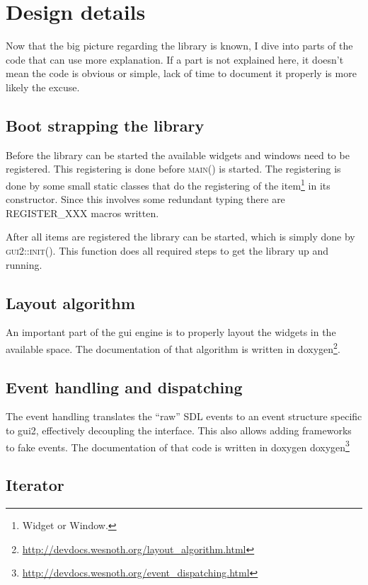 \chapter{Design details}

Now that the big picture regarding the library is known, I dive into parts of
the code that can use more explanation. If a part is not explained here, it doesn't mean
the code is obvious or simple, lack of time to document it properly is more
likely the excuse.

\section{Boot strapping the library}

Before the library can be started the available widgets and windows need to
be registered. This registering is done before \textsc{main()} is started.
The registering is done by some small static classes that do the registering
of the item\footnote{Widget or Window.} in its constructor. Since this
involves some redundant typing there are REGISTER\_XXX macros written.

After all items are registered the library can be started, which is simply
done by \textsc{gui2::init()}. This function does all required steps to get
the library up and running.

\section{Layout algorithm}

An important part of the gui engine is to properly layout the widgets in the
available space. The documentation of that algorithm is written in
doxygen\footnote{\url{http://devdocs.wesnoth.org/layout\_algorithm.html}}.

\section{Event handling and dispatching}
\label{event_handling}

The event handling translates the ``raw'' SDL events to an event structure
specific to gui2, effectively decoupling the interface. This also allows adding
frameworks to fake events. The documentation of that code is written in doxygen
doxygen\footnote{\url{http://devdocs.wesnoth.org/event_dispatching.html}}

\section{Iterator}

